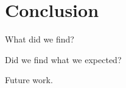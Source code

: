 \documentclass[../main.tex]{subfiles}
\begin{document}
\section{Conclusion}\label{sec:conclusion}

What did we find?

Did we find what we expected?

Future work.
\end{document}
